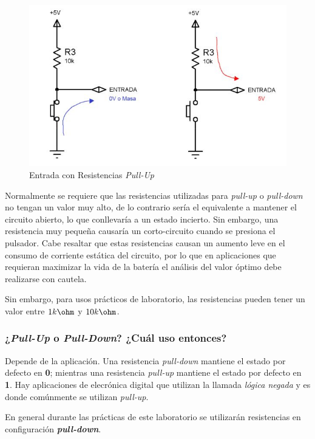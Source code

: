 \begin{figure}[H]
    \centering
    \includegraphics[scale=0.5]{images/pullUp.jpg}
    \caption{Entrada con Resistencias \emph{Pull-Up}}
    \label{Fig:PullUp}
\end{figure}

Normalmente se requiere que las resistencias utilizadas para \emph{pull-up} o \emph{pull-down} no tengan un valor muy alto, de lo contrario sería el equivalente a mantener el circuito abierto,
lo que conllevaría a un estado incierto. Sin embargo, una resistencia muy pequeña causaría un corto-circuito cuando se presiona el pulsador. Cabe resaltar que estas resistencias causan un aumento leve
en el consumo de corriente estática del circuito, por lo que en aplicaciones que requieran maximizar la vida de la batería el análisis del valor óptimo debe realizarse con cautela.

Sin embargo, para usos prácticos de laboratorio, las resistencias pueden tener un valor entre $1k\ohm$ y $10k\ohm$.

\subsubsection{¿\emph{Pull-Up} o \emph{Pull-Down}? ¿Cuál uso entonces?}
Depende de la aplicación. Una resistencia \emph{pull-down} mantiene el estado por defecto en \textbf{0}; mientras una resistencia \emph{pull-up} mantiene el estado por defecto en \textbf{1}.
Hay aplicaciones de elecrónica digital que utilizan la llamada \emph{lógica negada} y es donde comúnmente se utilizan \emph{pull-up}.

En general durante las prácticas de este laboratorio se utilizarán resistencias en configuración \textbf{\emph{pull-down}}.


